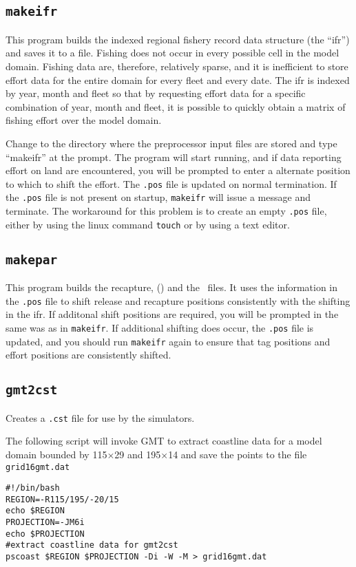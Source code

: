 \subsection*{{\tt makeifr}}
This program builds the indexed regional fishery record data structure
(the ``ifr'') and saves it to a file. 
Fishing does not occur in every
possible cell in the model domain. Fishing data are, therefore, 
relatively sparse, and it is inefficient to store effort data for the
entire domain for every fleet and every date.
The ifr is indexed by year, month
and fleet so that by requesting effort data for a specific combination
of year, month and fleet, it is possible to quickly obtain a matrix of
fishing effort over the model domain.

Change to the directory where the preprocessor input files are stored
and type ``makeifr'' at the prompt. The program will start running,
and if data reporting effort on land are encountered, you will be
prompted to enter a alternate position to which to shift the effort.
The {\tt .pos} file is updated on normal termination.
If the {\tt .pos} file is not present on startup, {\tt makeifr} will
issue a message and terminate. The workaround for this problem is to
create an empty {\tt .pos} file, either by using the linux command
{\tt touch} or by using a text editor.

\subsection*{{\tt makepar}}
This program builds the recapture, (\TAG) and the \PAR\ files. It uses
the information in the {\tt .pos} file to shift release and recapture
positions consistently with the shifting in the ifr. If additonal
shift positions are required, you will be prompted in the same was as
in {\tt makeifr}. If additional shifting does occur, the {\tt .pos} file is
updated, and you should run {\tt makeifr} again to ensure that tag
positions and effort positions are consistently shifted.


\subsection*{{\tt gmt2cst}}
Creates a {\tt .cst} file for use by the simulators.

The following script will invoke GMT to extract coastline data for a model
domain bounded by 115$\times$29 and
195$\times$14 and save the points to the file 
{\tt grid16gmt.dat}
{\par{}\normalbaselineskip
\begin{verbatim}
#!/bin/bash
REGION=-R115/195/-20/15
echo $REGION
PROJECTION=-JM6i
echo $PROJECTION
#extract coastline data for gmt2cst
pscoast $REGION $PROJECTION -Di -W -M > grid16gmt.dat
\end{verbatim}
\par}

